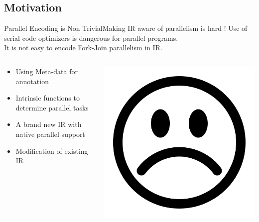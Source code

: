 \documentclass{beamer}
\begin{document}
\subsection{Motivation}
\begin{frame}{Parallel Encoding is Non Trivial}{Making IR aware of parallelism is hard !}
Use of serial code optimizers is dangerous for parallel programs.\\
It is not easy to encode Fork-Join parallelism in IR.\\
\begin{columns}[T]
  \begin{column}{0.5\textwidth}

  \begin{itemize}
      \item Using Meta-data for annotation
      \item Intrinsic functions to determine parallel tasks
      \item A brand new IR with native parallel support
      \item Modification of existing IR
  \end{itemize}
  \end{column}
  \begin{column}{0.5\textwidth}
  \includegraphics[scale=0.2]{sad}
  \end{column}
\end{columns}
\end{frame}
\end{document}
